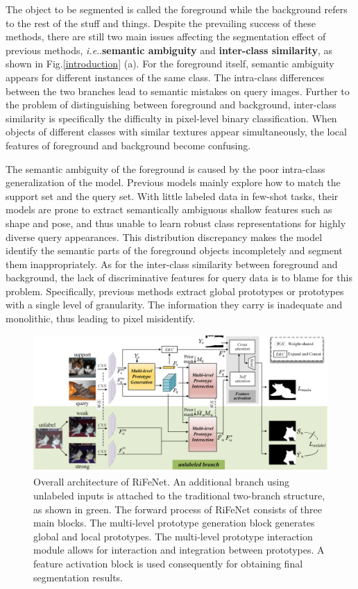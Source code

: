 \documentclass[letterpaper]{article} %
\makeatletter
\DeclareRobustCommand\onedot{\futurelet\@let@token\@onedot}
\def\@onedot{\ifx\@let@token.\else.\null\fi\xspace}
\def\ie{\emph{i.e}\onedot} \def\Ie{\emph{I.e}\onedot}
\makeatother
\begin{document}
The object to be segmented is called the foreground while the background refers to the rest of the stuff and things. Despite the prevailing success of these methods, there are still two main issues affecting the segmentation effect of previous methods, \ie \textbf{semantic ambiguity} and \textbf{inter-class similarity}, as shown in Fig.\ref{introduction} (a). For the foreground itself, semantic ambiguity appears for different instances of the same class. The intra-class differences between the two branches lead to semantic mistakes on query images. Further to the problem of distinguishing between foreground and background, inter-class similarity is specifically the difficulty in pixel-level binary classification. When objects of different classes with similar textures appear simultaneously, the local features of foreground and background become confusing.

The semantic ambiguity of the foreground is caused by the poor intra-class generalization of the model. Previous models mainly explore how to match the support set and the query set. With little labeled data in few-shot tasks, their models are prone to extract semantically ambiguous shallow features such as shape and pose, and thus unable to learn robust class representations for highly diverse query appearances. This distribution discrepancy makes the model identify the semantic parts of the foreground objects incompletely and segment them inappropriately. As for the inter-class similarity between foreground and background, the lack of discriminative features for query data is to blame for this problem. Specifically, previous methods extract global prototypes or prototypes with a single level of granularity. The information they carry is inadequate and monolithic, thus leading to pixel misidentify.

\begin{figure}[t]
\centering
\includegraphics[width=0.9\linewidth]{whole0304.pdf}

\caption{Overall architecture of RiFeNet. An additional branch using unlabeled inputs is attached to the traditional two-branch structure, as shown in green. The forward process of RiFeNet consists of three main blocks. The multi-level prototype generation block generates global and local prototypes. The multi-level prototype interaction module allows for interaction and integration between prototypes. A feature activation block is used consequently for obtaining final segmentation results.}
\label{overall}
\end{figure}
\end{document}
